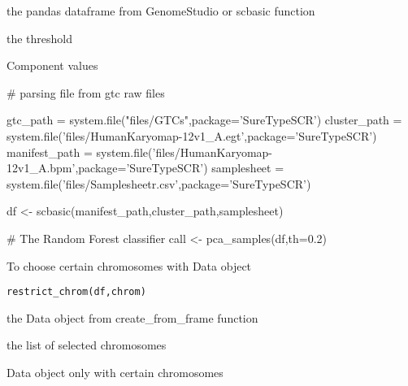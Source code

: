 \documentclass[a4paper]{book}
\begin{document}
%
\begin{Arguments}
\begin{ldescription}
\item[\code{df}] the pandas dataframe from GenomeStudio or scbasic function
\item[\code{th}] the threshold
\end{ldescription}
\end{Arguments}
%
\begin{Value}
Component values
\end{Value}
%
\begin{Examples}
\begin{ExampleCode}

# parsing file from gtc raw files

gtc_path = system.file("files/GTCs",package='SureTypeSCR')
cluster_path = system.file('files/HumanKaryomap-12v1_A.egt',package='SureTypeSCR')
manifest_path = system.file('files/HumanKaryomap-12v1_A.bpm',package='SureTypeSCR')
samplesheet = system.file('files/Samplesheetr.csv',package='SureTypeSCR')

df <- scbasic(manifest_path,cluster_path,samplesheet)

# The Random Forest classifier
call <- pca_samples(df,th=0.2) 




\end{ExampleCode}
\end{Examples}
%
\begin{Description}\relax
To choose certain chromosomes with Data object
\end{Description}
%
\begin{Usage}
\begin{verbatim}
restrict_chrom(df,chrom)
\end{verbatim}
\end{Usage}
%
\begin{Arguments}
\begin{ldescription}
\item[\code{df}] the Data object from create\_from\_frame function
\item[\code{chrom}] the list of selected chromosomes
\end{ldescription}
\end{Arguments}
%
\begin{Value}
Data object only with certain chromosomes
\end{Value}
%
\end{document}
